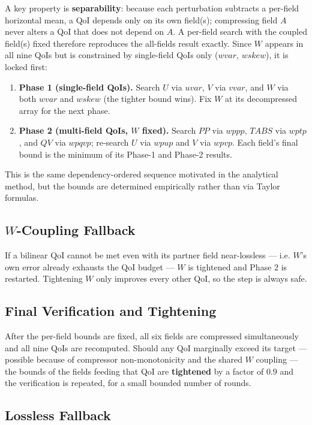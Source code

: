 \documentclass[11pt,a4paper]{article}
\begin{document}
A key property is \textbf{separability}: because each perturbation subtracts a
per-field horizontal mean, a QoI depends only on its own field(s); compressing
field $A$ never alters a QoI that does not depend on $A$. A per-field search with
the coupled field(s) fixed therefore reproduces the all-fields result exactly.
Since $W$ appears in all nine QoIs but is constrained by single-field QoIs only
($wvar$, $wskew$), it is locked first:
\begin{enumerate}
  \item \textbf{Phase 1 (single-field QoIs).} Search $U$ via $uvar$, $V$ via
  $vvar$, and $W$ via both $wvar$ and $wskew$ (the tighter bound wins). Fix $W$
  at its decompressed array for the next phase.
  \item \textbf{Phase 2 (multi-field QoIs, $W$ fixed).} Search $PP$ via $wppp$,
  $TABS$ via $wptp$, and $QV$ via $wpqvp$; re-search $U$ via $wpup$ and $V$ via
  $wpvp$. Each field's final bound is the minimum of its Phase-1 and Phase-2
  results.
\end{enumerate}
This is the same dependency-ordered sequence motivated in the analytical method,
but the bounds are determined empirically rather than via Taylor formulas.

\subsection{$W$-Coupling Fallback}

If a bilinear QoI cannot be met even with its partner field near-lossless --- i.e.
$W$'s own error already exhausts the QoI budget --- $W$ is tightened and Phase 2
is restarted. Tightening $W$ only improves every other QoI, so the step is always
safe.

\subsection{Final Verification and Tightening}

After the per-field bounds are fixed, all six fields are compressed
simultaneously and all nine QoIs are recomputed. Should any QoI marginally exceed
its target --- possible because of compressor non-monotonicity and the shared $W$
coupling --- the bounds of the fields feeding that QoI are \textbf{tightened} by a
factor of $0.9$ and the verification is repeated, for a small bounded number of
rounds.

\subsection{Lossless Fallback}
\end{document}
